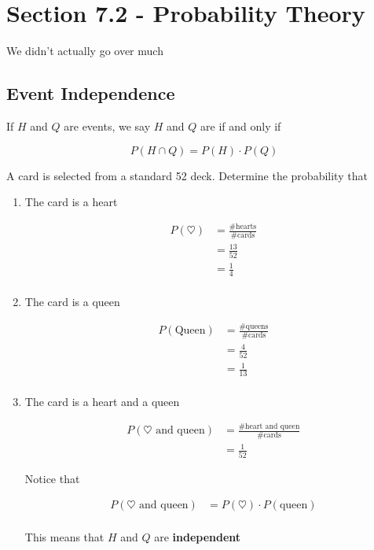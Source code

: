 \documentclass[../../Main.tex]{subfiles}
\begin{document}
\section{Section 7.2 - Probability Theory}

We didn't actually go over much

\subsection{Event Independence}

\begin{definition}
    If $H$ and $Q$ are events, we say $H$ and $Q$ are  if and only if

    $$P(H \cap Q) = P(H) \cdot P(Q)$$
\end{definition}

\begin{example}
    A card is selected from a standard 52 deck. Determine the probability that

    \begin{enumerate}
        \item
        {
            The card is a heart

            \begin{align*}
                P(\heartsuit) &= \frac{\text{\# hearts}}{\text{\# cards}} \\
                &= \frac{13}{52} \\
                &= \boxed{\frac{1}{4}} \\
            \end{align*}
        }
        \item 
        {
            The card is a queen

            \begin{align*}
                P(\text{Queen}) &= \frac{\text{\# queens}}{\text{\# cards}} \\
                &= \frac{4}{52} \\
                &= \boxed{\frac{1}{13}} \\
            \end{align*}
        }
        \item 
        {
            The card is a heart and a queen

            \begin{align*}
                P(\heartsuit \text{ and queen}) &= \frac{\text{\# heart and queen}}{\text{\# cards}} \\
                &= \frac{1}{52} 
            \end{align*}

            Notice that 

            \begin{align*}
                P(\heartsuit \text{ and queen}) &= P(\heartsuit) \cdot P(\text{queen}) \\
            \end{align*}

            This means that $H$ and $Q$ are \textbf{independent}
        }
    \end{enumerate}
\end{example}
\end{document}
